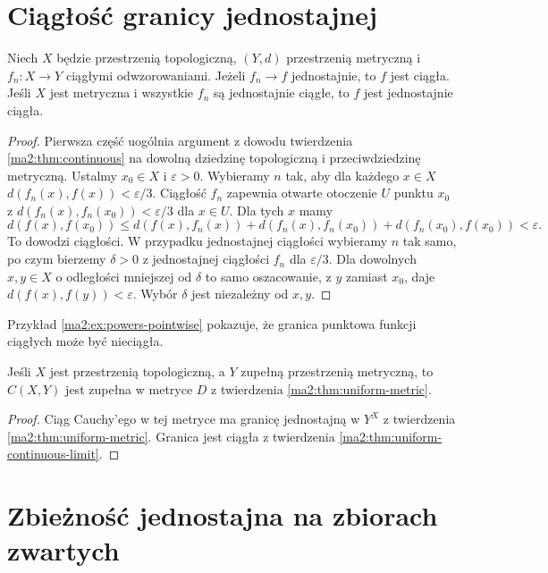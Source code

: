 \section{Ciągłość granicy jednostajnej}

\begin{twierdzenie}
\label{ma2:thm:uniform-continuous-limit}
Niech $X$ będzie przestrzenią topologiczną,
$(Y,d)$ przestrzenią metryczną i $f_n:X\to Y$
ciągłymi odwzorowaniami. Jeżeli $f_n\to f$
jednostajnie, to $f$ jest ciągła.
Jeśli $X$ jest metryczna i wszystkie $f_n$ są
jednostajnie ciągłe, to $f$ jest jednostajnie ciągła.
\end{twierdzenie}
\begin{proof}
Pierwsza część uogólnia argument z dowodu
twierdzenia \ref{ma2:thm:continuous} na dowolną
dziedzinę topologiczną i przeciwdziedzinę metryczną.
Ustalmy $x_0\in X$ i $\varepsilon>0$.
Wybieramy $n$ tak, aby dla każdego $x\in X$
$d(f_n(x),f(x))<\varepsilon/3$.
Ciągłość $f_n$ zapewnia otwarte otoczenie $U$
punktu $x_0$ z $d(f_n(x),f_n(x_0))<\varepsilon/3$
dla $x\in U$. Dla tych $x$ mamy
\[
 d(f(x),f(x_0))
 \le d(f(x),f_n(x))+d(f_n(x),f_n(x_0))
       +d(f_n(x_0),f(x_0))<\varepsilon.
\]
To dowodzi ciągłości.
W przypadku jednostajnej ciągłości wybieramy
$n$ tak samo, po czym bierzemy $\delta>0$
z jednostajnej ciągłości $f_n$ dla
$\varepsilon/3$. Dla dowolnych $x,y\in X$
o odległości mniejszej od $\delta$ to samo
oszacowanie, z $y$ zamiast $x_0$, daje
$d(f(x),f(y))<\varepsilon$.
Wybór $\delta$ jest niezależny od $x,y$.
\end{proof}
Przykład \ref{ma2:ex:powers-pointwise} pokazuje,
że granica punktowa funkcji ciągłych może
być nieciągła.

\begin{wniosek}
\label{ma2:cor:uniform-complete-continuous}
Jeśli $X$ jest przestrzenią topologiczną, a $Y$
zupełną przestrzenią metryczną, to $C(X,Y)$
jest zupełna w metryce $D$ z twierdzenia
\ref{ma2:thm:uniform-metric}.
\end{wniosek}
\begin{proof}
Ciąg Cauchy'ego w tej metryce ma granicę
jednostajną w $Y^X$ z twierdzenia
\ref{ma2:thm:uniform-metric}. Granica jest ciągła
z twierdzenia \ref{ma2:thm:uniform-continuous-limit}.
\end{proof}

\section{Zbieżność jednostajna na zbiorach zwartych}


